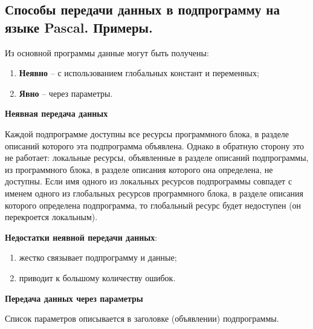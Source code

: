 



\newpage\subsection{Способы передачи данных в подпрограмму на языке Pascal. Примеры. }

\begin{myquote}
            
\end{myquote}

Из основной программы данные могут быть получены:

\begin{enumerate}
\item	{\bf{Неявно}} – с использованием глобальных констант и переменных;
\item	{\bf{Явно}} – через параметры.
\end{enumerate}

{\bf{Неявная передача данных}}

Каждой подпрограмме доступны все ресурсы программного блока, в разделе описаний которого эта подпрограмма объявлена. Однако в обратную сторону это не работает: локальные ресурсы, объявленные в разделе описаний подпрограммы, из программного блока, в разделе описания которого она определена, не доступны. Если имя одного из локальных ресурсов подпрограммы совпадет с именем одного из глобальных ресурсов программного блока, в разделе описания которого определена подпрограмма, то глобальный ресурс будет недоступен (он перекроется локальным).

{\bf{Недостатки неявной передачи данных}}:

\begin{enumerate}
    \item жестко связывает подпрограмму и данные;
    \item приводит к большому количеству ошибок.
\end{enumerate}

{\bf Передача данных через параметры}

Список параметров описывается в заголовке (объявлении) подпрограммы.
 

